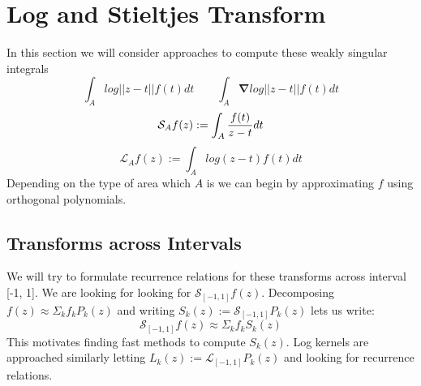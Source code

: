 \documentclass{article}
\begin{document}
\section{Log and Stieltjes Transform}
In this section we will consider approaches to compute these weakly singular integrals
$$ \int_Alog||z-t||f(t)dt \qquad \int_A\mathbf{\nabla}log||z-t||f(t)dt $$
\begin{equation}\label{stieltjes transform}
	\mathcal{S}_Af(z):= \int_A\frac{f(t)}{z-t}dt \\
\end{equation}
\begin{equation}\label{log transform}
	\mathcal{L}_Af(z):= \int_Alog(z-t)f(t)dt
\end{equation}
Depending on the type of area which $A$ is we can begin by approximating $f$ using orthogonal polynomials.
\subsection{Transforms across Intervals}
We will try to formulate recurrence relations for these transforms across interval [-1, 1].
We are looking for looking for $\mathcal{S}_{[-1,1]}f(z)$.
Decomposing $f(z) \approx \Sigma_k f_kP_k(z)$ and writing $S_k(z):=\mathcal{S}_{[-1,1]}P_k(z)$ lets us write:
$$\mathcal{S}_{[-1,1]}f(z) \approx \Sigma_k f_kS_k(z)$$
This motivates finding fast methods to compute $S_k(z)$. Log kernels are approached similarly letting $L_k(z):=\mathcal{L}_{[-1,1]}P_k(z)$ and looking for recurrence relations.
\end{document}
